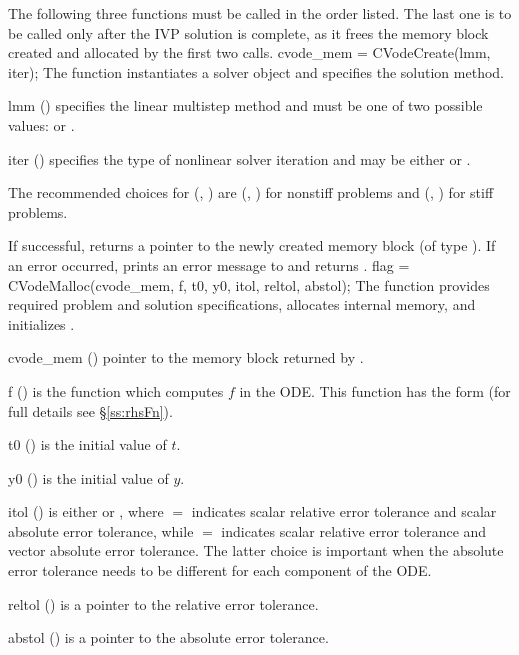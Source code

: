 The following three functions must be called in the order listed. The last one
is to be called only after the IVP solution is complete, as it frees the
{\cvode} memory block created and allocated by the first two calls.
{
  cvode\_mem = CVodeCreate(lmm, iter);
}
{
  The function  instantiates a {\cvode} solver object and
  specifies the solution method.
}
{
  \begin{args}[iter]
  \item[lmm] ()
    specifies the linear multistep method and must be one of two
    possible values:  or .     
  \item[iter] ()
    specifies the type of nonlinear solver iteration and may be
    either  or . 
  \end{args}
  The recommended choices for (, ) are
  (, ) for nonstiff problems and
  (, ) for stiff problems.
}
{
  If successful,  returns a pointer to the newly created 
  {\cvode} memory block (of type ).
  If an error occurred,  prints an error message to 
  and returns .
}
{}
{
flag = CVodeMalloc(cvode\_mem, f, t0, y0, itol, reltol, abstol);
}
{
  The function  provides required problem and solution
  specifications, allocates internal memory, and initializes {\cvode}.
}
{
  \begin{args}
  \item[cvode\_mem] ()
    pointer to the {\cvode} memory block returned by .
  \item[f] ()
    is the {\C} function which computes $f$ in the ODE. This function has the 
    form  (for full details see \S\ref{ss:rhsFn}).
  \item[t0] ()
    is the initial value of $t$.
  \item[y0] ()
    is the initial value of $y$. 
  \item[itol] () 
    is either  or , where $=$ indicates scalar
    relative error tolerance and scalar absolute error tolerance, while
    $=$ indicates scalar relative error tolerance and vector
    absolute error tolerance.  The latter choice is important when the absolute
    error tolerance needs to be different for each component of the ODE. 
  \item[reltol] ()
    is a pointer to the relative error tolerance.
  \item[abstol] ()
    is a pointer to the absolute error tolerance.
  \end{args}
}
